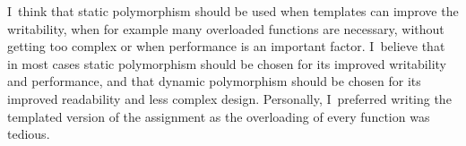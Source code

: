 \documentclass[a4paper]{report}
\begin{document}
I~think that static polymorphism should be used when templates can improve the writability, when for example many overloaded functions are necessary, without getting too complex or when performance is an important factor. I~believe that in most cases static polymorphism should be chosen for its improved writability and performance, and that dynamic polymorphism should be chosen for its improved readability and less complex design. Personally, I~preferred writing the templated version of the assignment as the overloading of every function was tedious.
\end{document}
